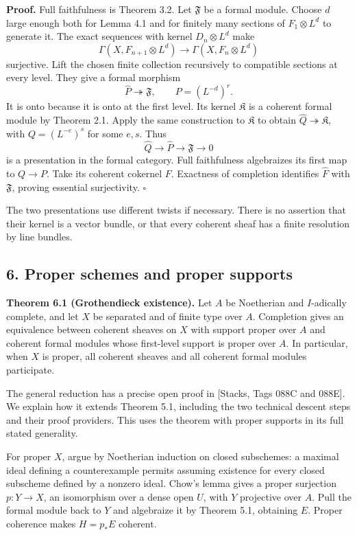 \documentclass[11pt]{article}
\begin{document}
\textbf{Proof.} Full faithfulness is Theorem 3.2. Let \(\mathfrak F\) be
a formal module. Choose \(d\) large enough both for Lemma 4.1 and for
finitely many sections of \(F_1\otimes L^d\) to generate it. The exact
sequences with kernel \(D_n\otimes L^d\) make \[
\Gamma(X,F_{n+1}\otimes L^d)\to\Gamma(X,F_n\otimes L^d)
\] surjective. Lift the chosen finite collection recursively to
compatible sections at every level. They give a formal morphism \[
\widehat P\twoheadrightarrow\mathfrak F,
\qquad P=(L^{-d})^r.
\] It is onto because it is onto at the first level. Its kernel
\(\mathfrak K\) is a coherent formal module by Theorem 2.1. Apply the
same construction to \(\mathfrak K\) to obtain
\(\widehat Q\twoheadrightarrow\mathfrak K\), with \(Q=(L^{-e})^s\) for
some \(e,s\). Thus \[
\widehat Q\longrightarrow\widehat P\longrightarrow\mathfrak F\to0
\] is a presentation in the formal category. Full faithfulness
algebraizes its first map to \(Q\to P\). Take its coherent cokernel
\(F\). Exactness of completion identifies \(\widehat F\) with
\(\mathfrak F\), proving essential surjectivity. \(\square\)

The two presentations use different twists if necessary. There is no
assertion that their kernel is a vector bundle, or that every coherent
sheaf has a finite resolution by line bundles.

\subsection{6. Proper schemes and proper
supports}\label{proper-schemes-and-proper-supports}

\textbf{Theorem 6.1 (Grothendieck existence).} Let \(A\) be Noetherian
and \(I\)-adically complete, and let \(X\) be separated and of finite
type over \(A\). Completion gives an equivalence between coherent
sheaves on \(X\) with support proper over \(A\) and coherent formal
modules whose first-level support is proper over \(A\). In particular,
when \(X\) is proper, all coherent sheaves and all coherent formal
modules participate.

The general reduction has a precise open proof in {[}Stacks, Tags 088C
and 088E{]}. We explain how it extends Theorem 5.1, including the two
technical descent steps and their proof providers. This uses the theorem
with proper supports in its full stated generality.

For proper \(X\), argue by Noetherian induction on closed subschemes: a
maximal ideal defining a counterexample permits assuming existence for
every closed subscheme defined by a nonzero ideal. Chow's lemma gives a
proper surjection \(p:Y\to X\), an isomorphism over a dense open \(U\),
with \(Y\) projective over \(A\). Pull the formal module back to \(Y\)
and algebraize it by Theorem 5.1, obtaining \(E\). Proper coherence
makes \(H=p_*E\) coherent.
\end{document}
